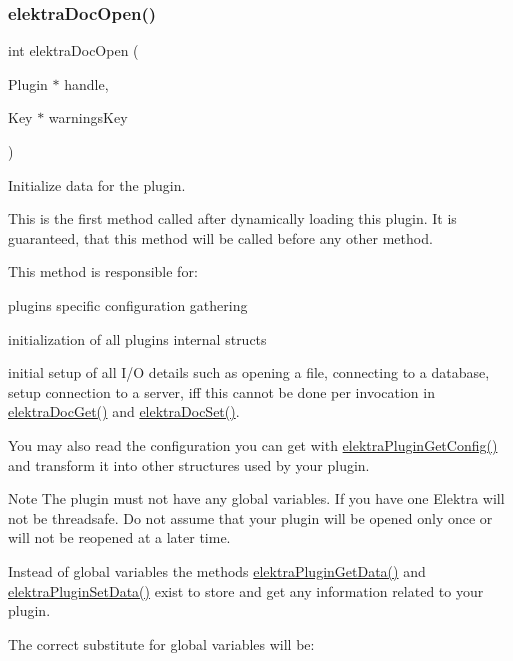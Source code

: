 \subsubsection{\texorpdfstring{elektra\+Doc\+Open()}{elektraDocOpen()}}
{\footnotesize\ttfamily int elektra\+Doc\+Open (\begin{DoxyParamCaption}\item[{Plugin $\ast$}]{handle,  }\item[{Key $\ast$}]{warnings\+Key }\end{DoxyParamCaption})}



Initialize data for the plugin. 

This is the first method called after dynamically loading this plugin. It is guaranteed, that this method will be called before any other method.

This method is responsible for\+:
\begin{DoxyItemize}
\item plugin\textquotesingle{}s specific configuration gathering
\item initialization of all plugin\textquotesingle{}s internal structs
\item initial setup of all I/O details such as opening a file, connecting to a database, setup connection to a server, iff this cannot be done per invocation in \hyperlink{group__plugin_gacb69f3441c6d84241b4362f958fbe313}{elektra\+Doc\+Get()} and \hyperlink{group__plugin_gae65781a1deb34efc79c8cb9d9174842c}{elektra\+Doc\+Set()}.
\end{DoxyItemize}

You may also read the configuration you can get with \hyperlink{group__plugin_ga644bead796506c172817724051c977c9}{elektra\+Plugin\+Get\+Config()} and transform it into other structures used by your plugin.

\begin{DoxyNote}{Note}
The plugin must not have any global variables. If you have one Elektra will not be threadsafe. Do not assume that your plugin will be opened only once or will not be reopened at a later time.
\end{DoxyNote}
Instead of global variables the methods \hyperlink{group__plugin_gaafcf3216b46292f222b8cc7828b4dd20}{elektra\+Plugin\+Get\+Data()} and \hyperlink{group__plugin_gaf4b941a52ff55d0ca2a9158d90208ef2}{elektra\+Plugin\+Set\+Data()} exist to store and get any information related to your plugin.

The correct substitute for global variables will be\+:


